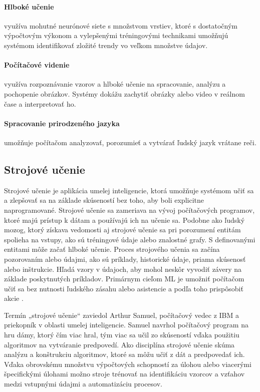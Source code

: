 \paragraph{Hlboké učenie} využíva mohutné neurónové siete s množstvom vrstiev, ktoré s dostatočným výpočtovým výkonom a vylepšenými tréningovými technikami umožňujú systémom identifikovať zložité trendy vo veľkom množstve údajov.

\paragraph{Počítačové videnie} využíva rozpoznávanie vzorov a hlboké učenie na spracovanie, analýzu a pochopenie obrázkov. Systémy dokážu zachytiť obrázky alebo video v reálnom čase a interpretovať ho.

\paragraph{Spracovanie prirodzeného jazyka} umožňuje počítačom analyzovať, porozumieť a vytvárať ľudský jazyk vrátane reči.

\subsection{Strojové učenie}
Strojové učenie je aplikácia umelej inteligencie, ktorá umožňuje systémom učiť sa a zlepšovať sa na základe skúseností bez toho, aby boli explicitne naprogramované. Strojové učenie sa zameriava na vývoj počítačových programov, ktoré majú prístup k dátam a používajú ich na učenie sa. Podobne ako ľudský mozog, ktorý získava vedomosti aj strojové učenie sa pri porozumení entitám spolieha na vstupy, ako sú tréningové údaje alebo znalostné grafy. S definovanými entitami môže začať hlboké učenie.
Proces strojového učenia sa začína pozorovaním alebo údajmi, ako sú príklady, historické údaje, priama skúsenosť alebo inštrukcie. Hľadá vzory v údajoch, aby mohol neskôr vyvodiť závery na základe poskytnutých príkladov. Primárnym cieľom ML je umožniť počítačom učiť sa bez nutnosti ľudského zásahu alebo asistencie a podľa toho prispôsobiť akcie \cite{ml1}.

Termín „strojové učenie“ zaviedol Arthur Samuel, počítačový vedec z IBM a priekopník v oblasti umelej inteligencie. Samuel navrhol počítačový program na hru dámy, ktorý čím viac hral, tým viac sa učil zo skúseností vďaka použitiu algoritmov na vytváranie predpovedí. Ako disciplína strojové učenie skúma analýzu a konštrukciu algoritmov, ktoré sa môžu učiť z dát a predpovedať ich. Vďaka obrovskému množstvu výpočtových schopností za úlohou alebo viacerými špecifickými úlohami možno stroje trénovať na identifikáciu vzorcov a vzťahov medzi vstupnými údajmi a automatizáciu procesov.

